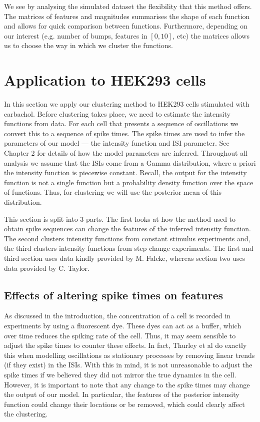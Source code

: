 \documentclass[../main.tex]{subfiles}
\begin{document}
We see by analysing the simulated dataset the flexibility that this method offers. The matrices of features and magnitudes summarises the shape of each function and allows for quick comparison between functions. Furthermore, depending on our interest (e.g. number of bumps, features in $[0,10]$, etc) the matrices allows us to choose the way in which we cluster the functions.  


\section{Application to HEK293 cells}

In this section we apply our clustering method to HEK293 cells stimulated with carbachol. Before clustering takes place, we need to estimate the intensity functions from data. For each cell that presents a sequence of  oscillations we convert this to a sequence of  spike times. The  spike times are used to infer the parameters of our model --- the intensity function and ISI parameter. See Chapter 2 for details of how the model parameters are inferred. Throughout all analysis we assume that the ISIs come from a Gamma distribution, where a priori the intensity function is piecewise constant.  Recall, the output for the intensity function is not a single function but a probability density function over the space of functions. Thus, for clustering we will use the posterior mean of this distribution.  
  
This section is split into 3 parts. The first looks at how the method used to obtain  spike sequences can change the features of the inferred intensity function. The second clusters intensity functions from constant stimulus experiments and, the third clusters intensity functions from step change experiments. The first and third section uses data kindly provided by M. Falcke, whereas section two uses data provided by C. Taylor. 

\subsection{Effects of altering  spike times on features}

As discussed in the introduction, the  concentration of a cell is recorded in experiments by using a fluorescent dye. These dyes can act as a  buffer, which over time reduces the spiking rate of the cell. Thus, it may seem sensible to adjust the  spike times to counter these effects. In fact, Thurley et al \cite{Thurley_2014} do exactly this when modelling  oscillations as stationary processes by removing linear trends (if they exist) in the ISIs. With this in mind, it is not unreasonable to adjust the  spike times if we believed they did not mirror the true dynamics in the cell. However, it is important to note that any change to the  spike times may change the output of our model. In particular, the features of the posterior intensity function could change their locations or be removed, which could clearly affect the clustering.
\end{document}
